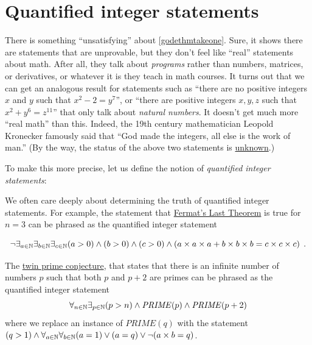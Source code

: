 \section{Quantified integer statements}\label{Quantified-integer-statem}

There is something ``unsatisfying'' about \cref{godethmtakeone}. Sure,
it shows there are statements that are unprovable, but they don't feel
like ``real'' statements about math. After all, they talk about
\emph{programs} rather than numbers, matrices, or derivatives, or
whatever it is they teach in math courses. It turns out that we can get
an analogous result for statements such as ``there are no positive
integers \(x\) and \(y\) such that \(x^2 - 2 = y^7\)'', or ``there are
positive integers \(x,y,z\) such that \(x^2 + y^6 = z^{11}\)'' that only
talk about \emph{natural numbers}. It doesn't get much more ``real
math'' than this. Indeed, the 19th century mathematician Leopold
Kronecker famously said that ``God made the integers, all else is the
work of man.'' (By the way, the status of the above two statements is
\href{https://goo.gl/qsU9zy}{unknown}.)

To make this more precise, let us define the notion of \emph{quantified
integer statements}:

\hypertarget{QIS-def}{}

We often care deeply about determining the truth of quantified integer
statements. For example, the statement that
\href{https://goo.gl/fvkuqj}{Fermat's Last Theorem} is true for \(n=3\)
can be phrased as the quantified integer statement

\[
\neg \exists_{a\in{\mathbb{N}}} \exists_{b\in{\mathbb{N}}} \exists_{c\in{\mathbb{N}}} (a>0) \wedge (b>0) \wedge (c>0) \wedge \left( a\times a \times a  + b \times b \times b = c\times c \times c \right) \;.
\]

The \href{https://goo.gl/GRiVz3}{twin prime conjecture}, that states
that there is an infinite number of numbers \(p\) such that both \(p\)
and \(p+2\) are primes can be phrased as the quantified integer
statement \[
\forall_{n\in{\mathbb{N}}} \exists_{p\in{\mathbb{N}}} (p>n) \wedge \mathit{PRIME}(p) \wedge \mathit{PRIME}(p+2)
\] where we replace an instance of \(\ensuremath{\mathit{PRIME}}(q)\)
with the statement
\((q>1) \wedge \forall_{a\in {\mathbb{N}}} \forall_{b\in{\mathbb{N}}} (a=1) \vee (a=q) \vee \neg (a\times b =q)\).

